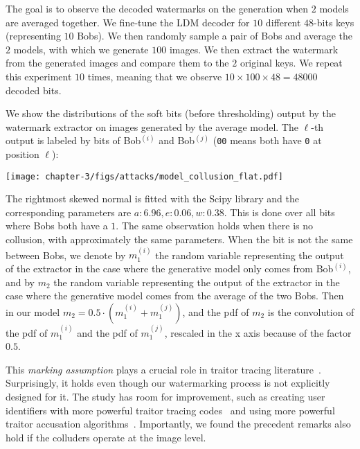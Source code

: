 The goal is to observe the decoded watermarks on the generation when $2$ models are averaged together.
We fine-tune the LDM decoder for $10$ different $48$-bits keys (representing $10$ Bobs).
We then randomly sample a pair of Bobs and average the $2$ models, with which we generate $100$ images.
We then extract the watermark from the generated images and compare them to the $2$ original keys.
We repeat this experiment $10$ times, meaning that we observe $10\times 100 \times 48=48000$ decoded bits.

We show the distributions of the soft bits (before thresholding) output by the watermark extractor on images generated by the average model. 
The $\ell$-th output is labeled by bits of Bob$^{(i)}$ and Bob$^{(j)}$ (\texttt{00} means both have \texttt{0} at position $\ell$):
\begin{center}
    \texttt{[image: chapter-3/figs/attacks/model\_collusion\_flat.pdf]}   
\end{center}
The rightmost skewed normal is fitted with the Scipy library and the corresponding parameters are $a:6.96, e:0.06, w:0.38$. 
This is done over all bits where Bobs both have a $1$.
The same observation holds when there is no collusion, with approximately the same parameters.
When the bit is not the same between Bobs, we denote by $m_1^{(i)}$ the random variable representing the output of the extractor in the case where the generative model only comes from Bob$^{(i)}$,
and by $m_2$ the random variable representing the output of the extractor in the case where the generative model comes from the average of the two Bobs.
Then in our model $m_2 = 0.5 \cdot ( m_1^{(i)} + m_1^{(j)})$, and the pdf of $m_2$ is the convolution of the pdf of $m_1^{(i)}$ and the pdf of $m_1^{(j)}$, rescaled in the x axis because of the factor $0.5$.

This \emph{marking assumption} plays a crucial role in traitor tracing literature~\citep{furon:hal-00757152,meerwald:hal-00740964, tardos2008optimal}.
Surprisingly, it holds even though our watermarking process is not explicitly designed for it.
The study has room for improvement, such as creating user identifiers with more powerful traitor tracing codes~\citep{tardos2008optimal} and using more powerful traitor accusation algorithms~\citep{furon:hal-00757152,meerwald:hal-00740964}.
Importantly, we found the precedent remarks also hold if the colluders operate at the image level.







